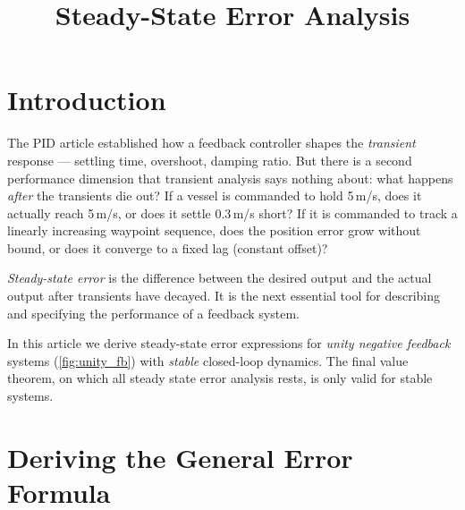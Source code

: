 \documentclass[12pt]{article}
\title{Steady-State Error Analysis}
\author{}
\date{}
\begin{document}
\maketitle
\tableofcontents
\newpage

\section{Introduction}
\label{sec:intro}

The PID article established how a feedback controller shapes the \emph{transient}
response --- settling time, overshoot, damping ratio.  But there is a second
performance dimension that transient analysis says nothing about: what happens
\emph{after} the transients die out?  If a vessel is commanded to hold 5\,m/s,
does it actually reach 5\,m/s, or does it settle 0.3\,m/s short?  If it is
commanded to track a linearly increasing waypoint sequence, does the position
error grow without bound, or does it converge to a fixed lag (constant offset)?

\emph{Steady-state error} is the difference between the desired output and the
actual output after transients have decayed.  It is the next essential tool for
describing and specifying the performance of a feedback system.


In this article we derive steady-state error expressions for
\emph{unity negative feedback} systems (\cref{fig:unity_fb}) with \emph{stable}
closed-loop dynamics.  The final value theorem, on which all steady state error analysis rests, is only valid
for stable systems. 

\section{Deriving the General Error Formula}
\label{sec:derivation}
\end{document}
